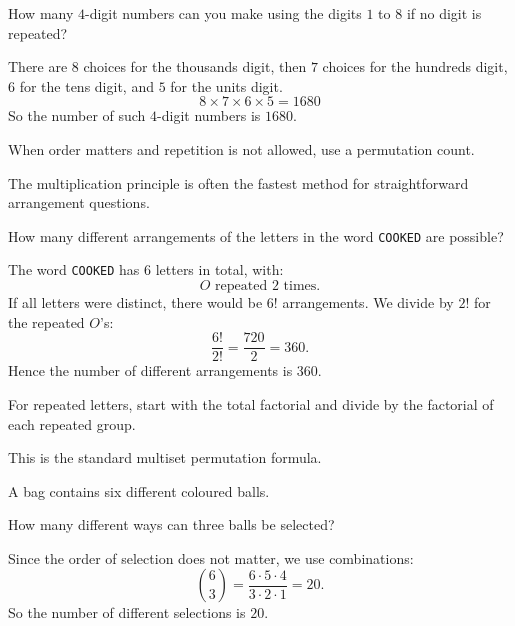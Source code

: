 \begin{problem}
How many $4$-digit numbers can you make using the digits $1$ to $8$ if no digit is repeated?
\end{problem}

\begin{solution}
There are $8$ choices for the thousands digit, then $7$ choices for the hundreds digit, $6$ for the tens digit, and $5$ for the units digit.
\[
8 \times 7 \times 6 \times 5 = 1680
\]
So the number of such $4$-digit numbers is $\boxed{1680}$.
\end{solution}

\begin{takeaways}
\item When order matters and repetition is not allowed, use a permutation count.
\item The multiplication principle is often the fastest method for straightforward arrangement questions.
\end{takeaways}

\begin{problem}
How many different arrangements of the letters in the word \texttt{COOKED} are possible?
\end{problem}

\begin{solution}
The word \texttt{COOKED} has $6$ letters in total, with:
\[
O \text{ repeated } 2 \text{ times}.
\]
If all letters were distinct, there would be $6!$ arrangements. We divide by $2!$ for the repeated $O$'s:
\[
\frac{6!}{2!} = \frac{720}{2} = 360.
\]
Hence the number of different arrangements is $\boxed{360}$.
\end{solution}

\begin{takeaways}
\item For repeated letters, start with the total factorial and divide by the factorial of each repeated group.
\item This is the standard multiset permutation formula.
\end{takeaways}

\begin{problem}
A bag contains six different coloured balls.

How many different ways can three balls be selected?
\end{problem}

\begin{solution}
Since the order of selection does not matter, we use combinations:
\[
\binom{6}{3} = \frac{6 \cdot 5 \cdot 4}{3 \cdot 2 \cdot 1} = 20.
\]
So the number of different selections is $\boxed{20}$.
\end{solution}


